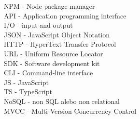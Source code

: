 NPM - Node package manager\\
API - Application programming interface\\
I/O - input and output\\
JSON - JavaScript Object Notation\\
HTTP - HyperText Transfer Protocol\\
URL - Uniform Resource Locator\\
SDK - Software development kit\\
CLI - Command-line interface\\
JS - JavaScript\\
TS - TypeScript\\
NoSQL - non SQL alebo non relational\\
MVCC - Multi-Version Concurrency Control\\